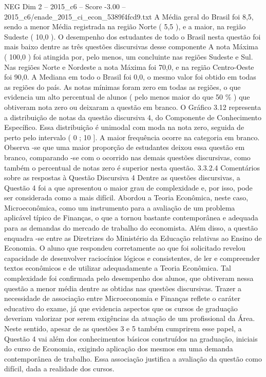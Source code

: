 \begin{textsample}{NEG Dim 2 – 2015\_c6 – Score -3.00 – 2015\_c6/enade\_2015\_ci\_econ\_5389f4fcd9.txt}
A Média geral do Brasil foi 8,5, sendo a menor Média registrada na região Norte ( 5,5 ), e a maior, na região Sudeste ( 10,0 ).
O desempenho dos estudantes de todo o Brasil nesta questão foi mais baixo dentre as três questões discursivas desse componente A nota Máxima ( 100,0 ) foi atingida por, pelo menos, um concluinte nas regiões Sudeste e Sul.
Nas regiões Norte e Nordeste a nota Máxima foi 70,0, e na região Centro-Oeste foi 90,0.
A Mediana em todo o Brasil foi 0,0, o mesmo valor foi obtido em todas as regiões do país.
As notas mínimas foram zero em todas as regiões, o que evidencia um alto percentual de alunos ( pelo menos maior do que 50 \% ) que obtiveram nota zero ou deixaram a questão em branco.
O Gráfico 3.12 representa a distribuição de notas da questão discursiva 4, do Componente de Conhecimento Específico.
Essa distribuição é unimodal com moda na nota zero, seguida de perto pelo intervalo ( 0 ; 10 ].
A maior frequência ocorre na categoria em branco.
Observa -se que uma maior proporção de estudantes deixou essa questão em branco, comparando -se com o ocorrido nas demais questões discursivas, como também o percentual de notas zero é superior nesta questão. 3.3.2.4 Comentários sobre as respostas à Questão Discursiva 4 Dentre as questões discursivas, a Questão 4 foi a que apresentou o maior grau de complexidade e, por isso, pode ser considerada como a mais difícil.
Abordou a Teoria Econômica, neste caso, Microeconômica, como um instrumento para a avaliação de um problema aplicável típico de Finanças, o que a tornou bastante contemporânea e adequada para as demandas do mercado de trabalho do economista.
Além disso, a questão enquadra -se entre as Diretrizes do Ministério da Educação relativas ao Ensino de Economia.
O aluno que respondeu corretamente ao que foi solicitado revelou capacidade de desenvolver raciocínios lógicos e consistentes, de ler e compreender textos econômicos e de utilizar adequadamente a Teoria Econômica.
Tal complexidade foi confirmada pelo desempenho dos alunos, que obtiveram nessa questão a menor média dentre as obtidas nas questões discursivas.
Trazer a necessidade de associação entre Microeconomia e Finanças reflete o caráter educativo do exame, já que evidencia aspectos que os cursos de graduação deveriam valorizar por serem exigências da atuação de um profissional da Área.
Neste sentido, apesar de as questões 3 e 5 também cumprirem esse papel, a Questão 4 vai além dos conhecimentos básicos construídos na graduação, iniciais do curso de Economia, exigindo aplicação dos mesmos em uma demanda contemporânea de trabalho.
Essa associação justifica a avaliação da questão como difícil, dada a realidade dos cursos.

\end{textsample}
